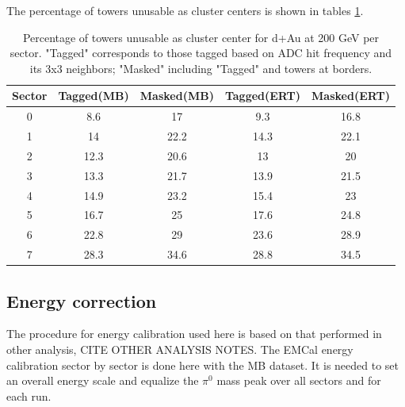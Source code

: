 \documentclass{article}
\begin{document}
The percentage of towers unusable as cluster centers is shown in tables \ref{table:table warnmap}.
\begin{table}[htb!]
  \begin{center}
    \begin{tabular}{||c|c|c|c|c||} 
\hline Sector & Tagged(MB) & Masked(MB) & Tagged(ERT) & Masked(ERT) \\ \hline
0 & 8.6 & 17 & 9.3 & 16.8 \\ \hline
1 & 14 & 22.2 & 14.3 & 22.1 \\ \hline
2 & 12.3 & 20.6 & 13 & 20 \\ \hline
3 & 13.3 & 21.7 & 13.9 & 21.5 \\ \hline
4 & 14.9 & 23.2 & 15.4 & 23 \\ \hline
5 & 16.7 & 25 & 17.6 & 24.8 \\ \hline
6 & 22.8 & 29 & 23.6 & 28.9 \\ \hline
7 & 28.3 & 34.6 & 28.8 & 34.5 \\ \hline
    \end{tabular}
  \end{center}
  \caption[Percentage of towers unusable as cluster center for d+Au at 200 GeV per sector]{Percentage of towers unusable as cluster center for d+Au at 200 GeV per sector. "Tagged" corresponds to those tagged 
  based on ADC hit frequency and its 3x3 neighbors; "Masked" including "Tagged" and towers at borders.}
  \label{table:table warnmap}
\end{table}
\subsection{Energy correction}
The procedure for energy calibration used here is based on that performed in other analysis, CITE OTHER ANALYSIS NOTES. 
The EMCal energy calibration sector by sector is done here with the MB dataset.
It is needed to set an overall energy scale and equalize the $\pi^{0}$ mass peak over all sectors and for each run.
\end{document}
